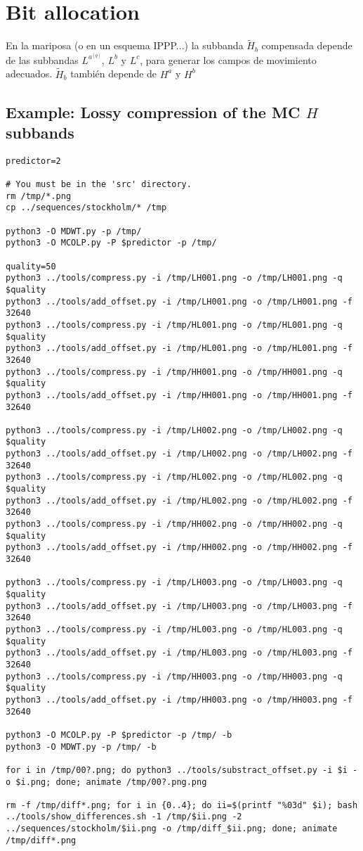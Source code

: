 
\section{Bit allocation}
En la mariposa (o en un esquema IPPP...) la subbanda $\tilde{H}_b$ compensada depende de las subbandas $L^a^{[q]}$, $L^b$ y $L^c$, para generar los campos de movimiento adecuados. $\tilde{H}_b$ también depende de $H^a$ y $H^b$ 

\subsection*{Example: Lossy compression of the MC $H$ subbands}

\begin{verbatim}
predictor=2

# You must be in the 'src' directory.
rm /tmp/*.png
cp ../sequences/stockholm/* /tmp

python3 -O MDWT.py -p /tmp/
python3 -O MCOLP.py -P $predictor -p /tmp/

quality=50
python3 ../tools/compress.py -i /tmp/LH001.png -o /tmp/LH001.png -q $quality
python3 ../tools/add_offset.py -i /tmp/LH001.png -o /tmp/LH001.png -f 32640
python3 ../tools/compress.py -i /tmp/HL001.png -o /tmp/HL001.png -q $quality
python3 ../tools/add_offset.py -i /tmp/HL001.png -o /tmp/HL001.png -f 32640
python3 ../tools/compress.py -i /tmp/HH001.png -o /tmp/HH001.png -q $quality
python3 ../tools/add_offset.py -i /tmp/HH001.png -o /tmp/HH001.png -f 32640

python3 ../tools/compress.py -i /tmp/LH002.png -o /tmp/LH002.png -q $quality
python3 ../tools/add_offset.py -i /tmp/LH002.png -o /tmp/LH002.png -f 32640
python3 ../tools/compress.py -i /tmp/HL002.png -o /tmp/HL002.png -q $quality
python3 ../tools/add_offset.py -i /tmp/HL002.png -o /tmp/HL002.png -f 32640
python3 ../tools/compress.py -i /tmp/HH002.png -o /tmp/HH002.png -q $quality
python3 ../tools/add_offset.py -i /tmp/HH002.png -o /tmp/HH002.png -f 32640

python3 ../tools/compress.py -i /tmp/LH003.png -o /tmp/LH003.png -q $quality
python3 ../tools/add_offset.py -i /tmp/LH003.png -o /tmp/LH003.png -f 32640
python3 ../tools/compress.py -i /tmp/HL003.png -o /tmp/HL003.png -q $quality
python3 ../tools/add_offset.py -i /tmp/HL003.png -o /tmp/HL003.png -f 32640
python3 ../tools/compress.py -i /tmp/HH003.png -o /tmp/HH003.png -q $quality
python3 ../tools/add_offset.py -i /tmp/HH003.png -o /tmp/HH003.png -f 32640

python3 -O MCOLP.py -P $predictor -p /tmp/ -b
python3 -O MDWT.py -p /tmp/ -b

for i in /tmp/00?.png; do python3 ../tools/substract_offset.py -i $i -o $i.png; done; animate /tmp/00?.png.png

rm -f /tmp/diff*.png; for i in {0..4}; do ii=$(printf "%03d" $i); bash ../tools/show_differences.sh -1 /tmp/$ii.png -2 ../sequences/stockholm/$ii.png -o /tmp/diff_$ii.png; done; animate /tmp/diff*.png
\end{verbatim}

